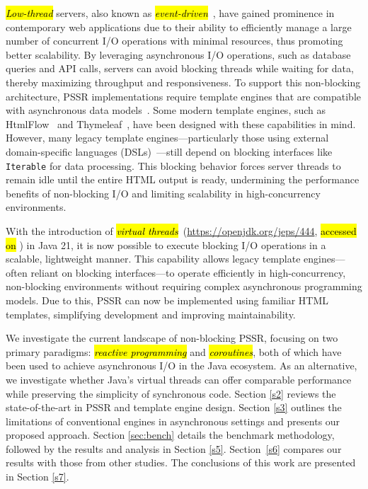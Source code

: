 \documentclass[software,article,accept,pdftex,moreauthors]{Definitions/mdpi}
\begin{document}
\textit{\hl{Low-thread}} servers, also known as
\textit{\hl{event-driven}}~\cite{event-driven-servers}, have gained prominence in
contemporary web applications due to their ability to efficiently manage a large
number of concurrent I/O operations with minimal resources, thus promoting
better scalability.
By leveraging asynchronous I/O operations, such as
database queries and API calls, servers can avoid blocking threads while
waiting for data, thereby maximizing throughput and responsiveness. To support
this non-blocking architecture, PSSR implementations require template engines
that are compatible with asynchronous data models~\cite{carvalho2023async}.
Some modern template engines, such as HtmlFlow~\cite{htmlflow} and Thymeleaf~\cite{thymeleaf}, have
been designed with these capabilities in mind. However, many legacy
template engines---particularly those using external domain-specific languages
(DSLs)~\cite{Fowler03}---still depend on blocking interfaces like
\texttt{Iterable} for data processing. This blocking behavior forces server
threads to remain idle until the entire HTML output is ready, undermining the
performance benefits of non-blocking I/O and limiting scalability in
high-concurrency environments.

With the introduction of \textit{\hl{virtual
    threads}}~({\url{https://openjdk.org/jeps/444}}, \hl{accessed on}%
) in Java 21, it is now
possible to execute blocking I/O operations in a scalable, lightweight manner.
This capability allows legacy template engines---often reliant on blocking
interfaces---to operate efficiently in high-concurrency, non-blocking
environments without requiring complex asynchronous programming models. Due to this, PSSR can now be implemented using familiar HTML templates, simplifying
development and improving maintainability.

We investigate the current landscape of non-blocking PSSR, focusing on two
primary paradigms: \textit{\hl{reactive programming}} and \textit{\hl{coroutines}}, both
of which have been used to achieve asynchronous I/O in the Java ecosystem. As
an alternative, we investigate whether Java’s virtual threads can offer
comparable performance while preserving the simplicity of synchronous code.
Section \ref{s2} reviews the state-of-the-art in PSSR and template engine design.
Section \ref{s3} outlines the limitations of conventional engines in asynchronous
settings and presents our proposed approach. Section \ref{sec:bench} details the benchmark
methodology, followed by the results and analysis in Section \ref{s5}.
Section~\ref{s6} compares our results with those from other studies.
The conclusions of this work are presented in Section \ref{s7}.
\end{document}
